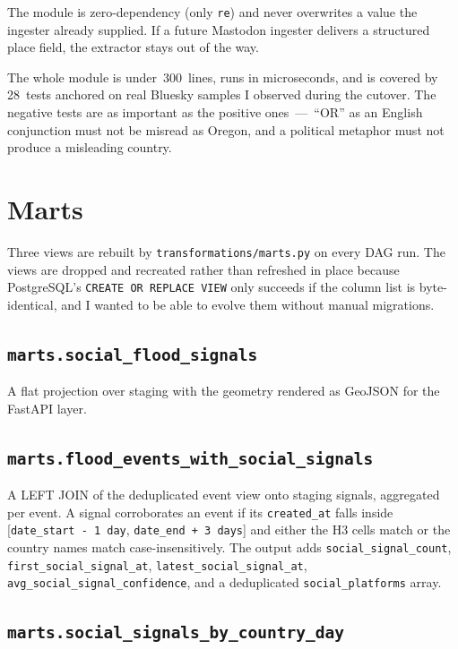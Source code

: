 \documentclass[11pt]{article}
\begin{document}
The module is zero-dependency (only \texttt{re}) and never overwrites a
value the ingester already supplied. If a future Mastodon ingester
delivers a structured place field, the extractor stays out of the way.

The whole module is under~300~lines, runs in microseconds, and is
covered by 28~tests anchored on real Bluesky samples I observed during
the cutover. The negative tests are as important as the positive
ones~---~``OR'' as an English conjunction must not be misread as
Oregon, and a political metaphor must not produce a misleading country.

\section{Marts}

Three views are rebuilt by \texttt{transformations/marts.py} on every
DAG run. The views are dropped and recreated rather than refreshed
in place because PostgreSQL's \texttt{CREATE OR REPLACE VIEW} only
succeeds if the column list is byte-identical, and I wanted to be able
to evolve them without manual migrations.

\subsection{\texttt{marts.social\_flood\_signals}}

A flat projection over staging with the geometry rendered as GeoJSON
for the FastAPI layer.

\subsection{\texttt{marts.flood\_events\_with\_social\_signals}}

A LEFT JOIN of the deduplicated event view onto staging signals,
aggregated per event. A signal corroborates an event if its
\texttt{created\_at} falls inside [\texttt{date\_start - 1 day},
\texttt{date\_end + 3 days}] and either the H3 cells match or the
country names match case-insensitively. The output adds
\texttt{social\_signal\_count},
\texttt{first\_social\_signal\_at},
\texttt{latest\_social\_signal\_at},
\texttt{avg\_social\_signal\_confidence}, and a deduplicated
\texttt{social\_platforms} array.

\subsection{\texttt{marts.social\_signals\_by\_country\_day}}
\end{document}
